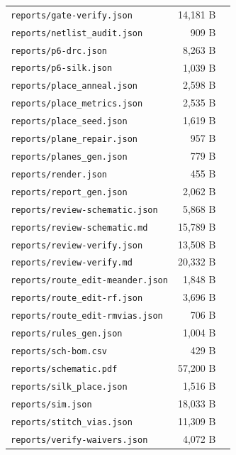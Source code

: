 \documentclass[11pt,a4paper]{article}
\begin{document}
{\begin{longtable}{p{9cm}rp{4cm}}
\texttt{reports/gate-verify.json} & 14,181 B &  \\
\texttt{reports/netlist\_audit.json} & 909 B &  \\
\texttt{reports/p6-drc.json} & 8,263 B &  \\
\texttt{reports/p6-silk.json} & 1,039 B &  \\
\texttt{reports/place\_anneal.json} & 2,598 B &  \\
\texttt{reports/place\_metrics.json} & 2,535 B &  \\
\texttt{reports/place\_seed.json} & 1,619 B &  \\
\texttt{reports/plane\_repair.json} & 957 B &  \\
\texttt{reports/planes\_gen.json} & 779 B &  \\
\texttt{reports/render.json} & 455 B &  \\
\texttt{reports/report\_gen.json} & 2,062 B &  \\
\texttt{reports/review-schematic.json} & 5,868 B &  \\
\texttt{reports/review-schematic.md} & 15,789 B &  \\
\texttt{reports/review-verify.json} & 13,508 B &  \\
\texttt{reports/review-verify.md} & 20,332 B &  \\
\texttt{reports/route\_edit-meander.json} & 1,848 B &  \\
\texttt{reports/route\_edit-rf.json} & 3,696 B &  \\
\texttt{reports/route\_edit-rmvias.json} & 706 B &  \\
\texttt{reports/rules\_gen.json} & 1,004 B &  \\
\texttt{reports/sch-bom.csv} & 429 B &  \\
\texttt{reports/schematic.pdf} & 57,200 B &  \\
\texttt{reports/silk\_place.json} & 1,516 B &  \\
\texttt{reports/sim.json} & 18,033 B &  \\
\texttt{reports/stitch\_vias.json} & 11,309 B &  \\
\texttt{reports/verify-waivers.json} & 4,072 B &  \\
\bottomrule
\end{longtable}
}
\end{document}
